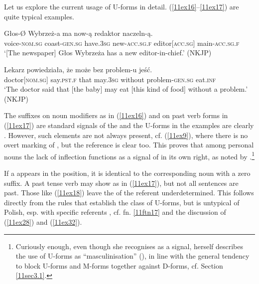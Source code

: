 \documentclass[output=paper,colorlinks,citecolor=brown]{langscibook}
\begin{document}
Let us explore the current usage of U-forms in detail. (\ref{11ex16}--\ref{11ex17}) are quite typical examples.

\begin{exe}
	\ex \label{11ex16}
	\gll Głos-Ø Wybrzeż-a ma now-ą redaktor naczeln-ą. \\
	voice-\textsc{nom.sg} coast-\textsc{gen.sg} have.\textsc{3sg} new-\textsc{acc.sg.f} editor[\textsc{acc.sg}] main-\textsc{acc.sg.f} \\
	\trans ‘[The newspaper] Głos Wybrzeża has a new editor-in-chief.’ \hfill (NKJP)
	
	\ex \label{11ex17}
	\gll Lekarz powiedziała, że może bez problem-u jeść. \\
	doctor[\textsc{nom.sg}] say.\textsc{pst.f} that may.\textsc{3sg} without problem-\textsc{gen.sg} eat.\textsc{inf} \\
	\trans ‘The doctor said that [the baby] may eat [this kind of food] without a problem.’ \hfill (NKJP)
\end{exe}

The suffixes on noun modifiers as in (\ref{11ex16}) and on past verb forms in (\ref{11ex17}) are standard signals of the   and the U-forms in the examples are clearly . However, such elements are not always present, cf. (\ref{11ex9}), where there is no overt marking of , but the  reference is clear too. This proves that among personal nouns the lack of inflection functions as a signal of   in its own right, as noted by \citet{obrebska-jablonska1949}.\footnote{Curiously	enough, even though she recognises  as a  signal, \citeauthor{obrebska-jablonska1949} herself describes the use of U-forms as ``masculinisation'' (\citeyear[1]{obrebska-jablonska1949}), in line with the general tendency to block U-forms and M-forms together against D-forms, cf. Section \ref{11sec3.1}.}

If a  appears in the  position, it is identical to the corresponding  noun with a zero suffix. A past tense verb may show  as in (\ref{11ex17}), but not all sentences are past. Those like (\ref{11ex18}) leave the  of the referent underdetermined. This follows directly from the rules that establish the class of U-forms, but is untypical of Polish, esp. with specific referents \citep[263]{lazinski2006}, cf. fn. \ref{11ftn17} and the discussion of (\ref{11ex28}) and (\ref{11ex32}).
\end{document}
